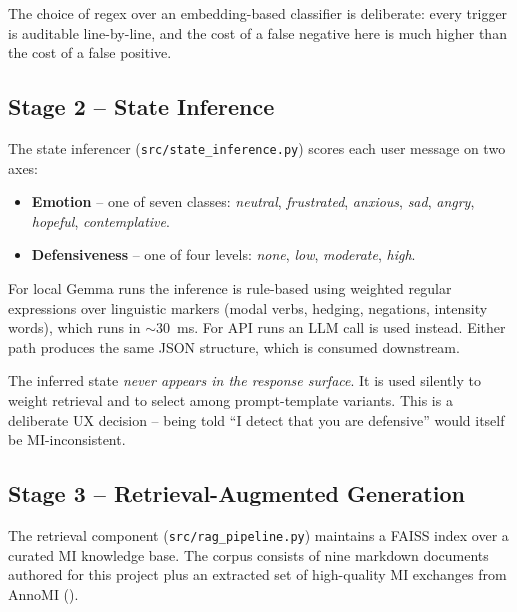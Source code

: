The choice of regex over an embedding-based classifier is deliberate: every
trigger is auditable line-by-line, and the cost of a false negative here is
much higher than the cost of a false positive.

\subsection{Stage 2 -- State Inference}

The state inferencer (\texttt{src/state\_inference.py}) scores each user
message on two axes:

\begin{itemize}
    \item \textbf{Emotion} -- one of seven classes:
    \textit{neutral}, \textit{frustrated}, \textit{anxious}, \textit{sad},
    \textit{angry}, \textit{hopeful}, \textit{contemplative}.
    \item \textbf{Defensiveness} -- one of four levels:
    \textit{none}, \textit{low}, \textit{moderate}, \textit{high}.
\end{itemize}

For local Gemma runs the inference is rule-based using weighted regular
expressions over linguistic markers (modal verbs, hedging, negations, intensity
words), which runs in $\sim$30~ms. For API runs an LLM call is used instead.
Either path produces the same JSON structure, which is consumed downstream.

The inferred state \emph{never appears in the response surface}. It is used
silently to weight retrieval and to select among prompt-template variants.
This is a deliberate UX decision -- being told ``I detect that you are
defensive'' would itself be MI-inconsistent.

\subsection{Stage 3 -- Retrieval-Augmented Generation}

The retrieval component (\texttt{src/rag\_pipeline.py}) maintains a FAISS index
over a curated MI knowledge base. The corpus consists of nine markdown
documents authored for this project plus an extracted set of high-quality MI
exchanges from AnnoMI ().

